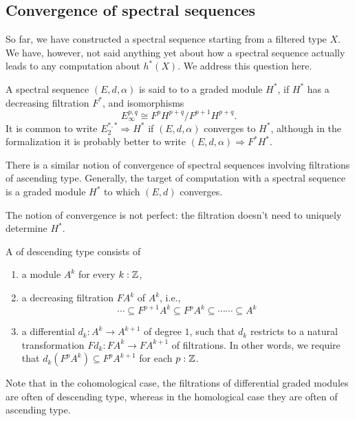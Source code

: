 \documentclass[reqno]{amsart}
\begin{document}
\subsection{Convergence of spectral sequences}
So far, we have constructed a spectral sequence starting from a filtered type
$X$. We have, however, not said anything yet about how a spectral sequence
actually leads to any computation about $h^\ast(X)$. We address this question
here.

\begin{defn}
A spectral sequence $(E,d,\alpha)$ is said to 
to a graded module $H^\ast$, if $H^\ast$ has a decreasing filtration $F^\ast$, and isomorphisms
\begin{equation*}
E^{p,q}_\infty \cong F^pH^{p+q}/F^{p+1}H^{p+q}.
\end{equation*}
It is common to write $E_2^{\ast,\ast}\Rightarrow H^\ast$ if $(E,d,\alpha)$ converges to $H^\ast$,
although in the formalization it is probably better to write $(E,d,\alpha)\Rightarrow F^\ast H^\ast$. 
\end{defn}

There is a similar notion of convergence of spectral sequences involving filtrations of ascending type.
Generally, the target of computation with a spectral sequence is a graded module $H^\ast$ to which $(E,d)$ converges.

The notion of convergence is not perfect: the filtration doesn't need to uniquely
determine $H^\ast$. 

\begin{defn}
A  of descending type consists of
\begin{enumerate}
\item a module $A^k$ for every $k:\mathbb{Z}$,
\item a decreasing filtration $FA^k$ of $A^k$, i.e.,
\begin{equation*}
\cdots\subseteq F^{p+1}A^k \subseteq F^pA^k \subseteq \cdots\cdots\subseteq A^k
\end{equation*}
\item a differential $d_k:A^k\to A^{k+1}$ of degree $1$, such that $d_k$ restricts
to a natural transformation $Fd_k :FA^k\to FA^{k+1}$ of filtrations. In other
words, we require that $d_k(F^p A^k)\subseteq F^p A^{k+1}$ for each $p:\mathbb{Z}$. 
\end{enumerate}
\end{defn}

Note that in the cohomological case, the filtrations of differential graded
modules are often of descending type, whereas in the homological case they are
often of ascending type.
\end{document}
